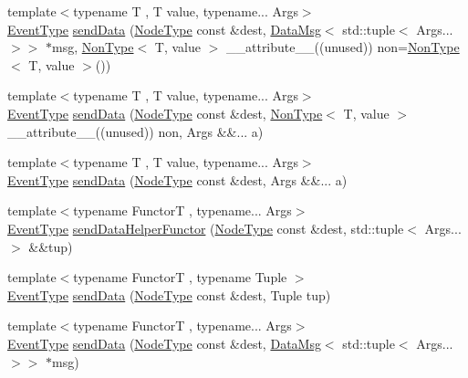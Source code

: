 \begin{DoxyCompactItemize}
\item 
{\footnotesize template$<$typename T , T value, typename... Args$>$ }\\\hyperlink{namespacevt_a009267401def7ae8bf201892222d060f}{Event\+Type} \hyperlink{structvt_1_1param_1_1_param_a40cf6112cd6f7a4167680e8fa5c1eb1e}{send\+Data} (\hyperlink{namespacevt_a866da9d0efc19c0a1ce79e9e492f47e2}{Node\+Type} const \&dest, \hyperlink{structvt_1_1param_1_1_data_msg}{Data\+Msg}$<$ std\+::tuple$<$ Args... $>$$>$ $\ast$msg, \hyperlink{structvt_1_1param_1_1_non_type}{Non\+Type}$<$ T, value $>$ \+\_\+\+\_\+attribute\+\_\+\+\_\+((unused)) non=\hyperlink{structvt_1_1param_1_1_non_type}{Non\+Type}$<$ T, value $>$())
\item 
{\footnotesize template$<$typename T , T value, typename... Args$>$ }\\\hyperlink{namespacevt_a009267401def7ae8bf201892222d060f}{Event\+Type} \hyperlink{structvt_1_1param_1_1_param_a18098e4b5fe1dbf053db7d8d8d3317d8}{send\+Data} (\hyperlink{namespacevt_a866da9d0efc19c0a1ce79e9e492f47e2}{Node\+Type} const \&dest, \hyperlink{structvt_1_1param_1_1_non_type}{Non\+Type}$<$ T, value $>$ \+\_\+\+\_\+attribute\+\_\+\+\_\+((unused)) non, Args \&\&... a)
\item 
{\footnotesize template$<$typename T , T value, typename... Args$>$ }\\\hyperlink{namespacevt_a009267401def7ae8bf201892222d060f}{Event\+Type} \hyperlink{structvt_1_1param_1_1_param_a6ad80695f54db7da23e920bef98af13a}{send\+Data} (\hyperlink{namespacevt_a866da9d0efc19c0a1ce79e9e492f47e2}{Node\+Type} const \&dest, Args \&\&... a)
\item 
{\footnotesize template$<$typename FunctorT , typename... Args$>$ }\\\hyperlink{namespacevt_a009267401def7ae8bf201892222d060f}{Event\+Type} \hyperlink{structvt_1_1param_1_1_param_ad665f1614785929383007acbc26a9a41}{send\+Data\+Helper\+Functor} (\hyperlink{namespacevt_a866da9d0efc19c0a1ce79e9e492f47e2}{Node\+Type} const \&dest, std\+::tuple$<$ Args... $>$ \&\&tup)
\item 
{\footnotesize template$<$typename FunctorT , typename Tuple $>$ }\\\hyperlink{namespacevt_a009267401def7ae8bf201892222d060f}{Event\+Type} \hyperlink{structvt_1_1param_1_1_param_af49d5db588fcdbf6355cd6a055666531}{send\+Data} (\hyperlink{namespacevt_a866da9d0efc19c0a1ce79e9e492f47e2}{Node\+Type} const \&dest, Tuple tup)
\item 
{\footnotesize template$<$typename FunctorT , typename... Args$>$ }\\\hyperlink{namespacevt_a009267401def7ae8bf201892222d060f}{Event\+Type} \hyperlink{structvt_1_1param_1_1_param_a4ab35026b32979ddba2708379ebe8185}{send\+Data} (\hyperlink{namespacevt_a866da9d0efc19c0a1ce79e9e492f47e2}{Node\+Type} const \&dest, \hyperlink{structvt_1_1param_1_1_data_msg}{Data\+Msg}$<$ std\+::tuple$<$ Args... $>$$>$ $\ast$msg)

\end{DoxyCompactItemize}
